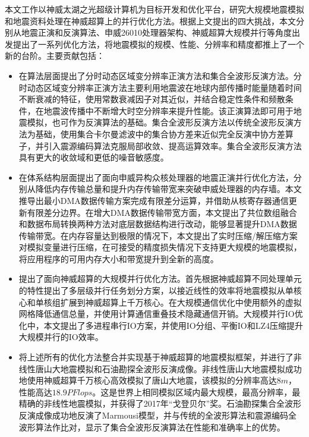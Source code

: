 本文工作以神威太湖之光超级计算机为目标开发和优化平台，研究大规模地震模拟和地震资料处理在神威超算上的并行优化方法。根据上文提出的四大挑战，本文分别从地震正演和反演算法、申威26010处理器架构、神威超算大规模并行等角度出发提出了一系列优化方法，将地震模拟的规模、性能、分辨率和精度都推上了一个新的台阶。主要贡献包括：

\begin{itemize}
  \item 在算法层面提出了分时动态区域变分辨率正演方法和集合全波形反演方法。分时动态区域变分辨率正演方法主要利用地震波在地球内部传播时能量随着时间不断衰减的特征，使用常数衰减因子对其近似，并结合稳定性条件和频散条件，在地震波传播中不断增大时空分辨率来提升性能。该正演算法即可用于地震模拟，也可作为反演算法的基础。集合全波形反演方法以传统全波形反演方法为基础，使用集合卡尔曼滤波中的集合协方差来近似完全反演中协方差算子，并引入震源编码算法克服局部收敛、提高运算效率。集合全波形反演方法具有更大的收敛域和更低的噪音敏感度。

  \item 在体系结构层面提出了面向申威异构众核处理器的地震正演并行优化方法，分别从降低内存传输总量和提升内存传输带宽来突破申威处理器的内存墙。本文推导出最小DMA数据传输方案完成有限差分运算，并借助从核寄存器通信更新有限差分边界。在增大DMA数据传输带宽方面，本文提出了共位数组融合和数据布局转换两种方法对底层数据结构进行改动，能够显著提升DMA数据传输带宽。在内存容量达到极限的情况下，本文提出了实时压缩/解压缩方案对模拟变量进行压缩，在可接受的精度损失情况下支持更大规模的地震模拟，将应用程序的可用内存大小和带宽提升到全新的高度。

  \item 提出了面向神威超算的大规模并行优化方法。首先根据神威超算不同处理单元的特性提出了多层级并行任务划分方案，以接近线性的效率将地震模拟从单核心和单核组扩展到神威超算上千万核心。在大规模通信优化中使用额外的虚拟网格降低通信总量，并使用计算通信重叠技术隐藏通信开销。大规模并行IO优化中，本文提出了多进程串行IO方案，并使用IO分组、平衡IO和LZ4压缩提升大规模并行的IO效率。

  \item 将上述所有的优化方法整合并实现基于神威超算的地震模拟框架，并进行了非线性唐山大地震模拟和石油勘探全波形反演成像。非线性唐山大地震模拟成功地使用神威超算千万核心高效模拟了唐山大地震，该模拟的分辨率高达$8m$，性能高达$18.9PFlops$。这是世界上相同模拟区域内最大规模，最高分辨率，最精确的非线性地震模拟，并获得了2017年“戈登贝尔”奖。石油勘探集合全波形反演成像成功地反演了Marmousi模型，并与传统的全波形算法和震源编码全波形算法作比对，显示了集合全波形反演算法在性能和准确率上的优势。

\end{itemize}

